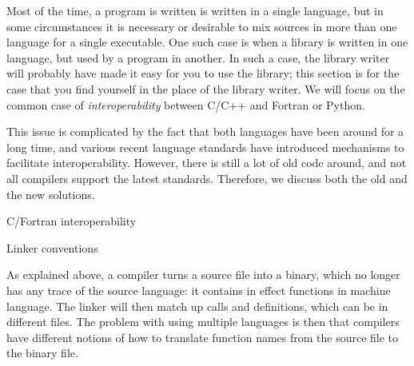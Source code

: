 

Most of the time, a program is written is written in a single
language, but in some circumstances it is necessary or desirable to
mix sources in more than one language for a single executable. One
such case is when a library is written in one language, but used by a
program in another. In such a case, the library writer will probably
have made it easy for you to use the library; this section is for the
case that you find yourself in the place of the library writer. We
will focus on the common case of \emph{interoperability} between C/C++ and
Fortran or Python.

This issue is complicated by the fact that both languages have
been around for a long time, and various recent language standards
have introduced mechanisms to facilitate interoperability.
However, there is still a lot of old code around, and not all compilers
support the latest standards. Therefore, we discuss both the old 
and the new solutions.

 {C/Fortran interoperability}

 {Linker conventions}

As explained above, a compiler turns a source file into a binary,
which no longer has any trace of the source language: it contains in
effect functions in machine language. The linker will then match up
calls and definitions, which can be in different files. The problem
with using multiple languages is then that compilers have different
notions of how to translate function names from the source file to the
binary file.

